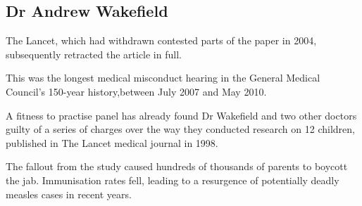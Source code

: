 \subsection*{Dr Andrew Wakefield}

The Lancet, which had withdrawn contested parts of the paper in 2004, subsequently retracted the article in full.
 
This was the longest medical misconduct hearing in the General Medical Council’s 150-year history,between July 2007 and May 2010.
 
A fitness to practise panel has already found Dr Wakefield and two other doctors guilty of a series of charges over the way they conducted research on 12 children, published in The Lancet medical journal in 1998.
 
The fallout from the study caused hundreds of thousands of parents to boycott the jab. Immunisation rates fell, leading to a resurgence of potentially deadly measles cases in recent years.
 



